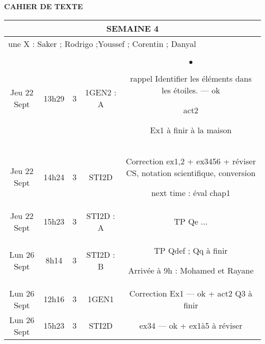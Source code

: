 \documentclass[10pt]{article}
\newcommand{\mypage}[1]{ 
		\begin{minipage}[c]{0.45\textwidth}
			\vspace{5pt}
			{#1}
			\vspace{5pt}
		\end{minipage}
}
\newcommand{\seancea}{	\mypage{
	\begin{list}{$\bullet$}{}
		\item rappel Identifier les éléments dans les étoiles. — ok
		\item act2
		\item Ex1 à finir à la maison
	\end{list}
}}
\newcommand{\seanceb}{	\mypage{ Correction ex1,2 + ex3456 + réviser CS, notation
scientifique, conversion

next time : éval chap1}}
\newcommand{\seancec}{	\mypage{TP Qe ...}}
\newcommand{\seanced}{	\mypage{
	TP Qdef ; Qq à finir
	
	Arrivée à 9h : Mohamed et Rayane
	}}
\newcommand{\seancef}{	\mypage{
	Correction Ex1 --- ok
	+ act2 Q3 à finir 
	}}
\newcommand{\seanceg}{	\mypage{ex34 --- ok 
	+ ex1à5 à réviser
	}}
\begin{document}
\begin{center}
	\textbf{CAHIER DE TEXTE}
\end{center}

\setlength{\tabcolsep}{13pt}
\renewcommand{\arraystretch}{2.5}
\begin{longtable}{@{}|c|c|c|c|c|@{}} \toprule
	\midrule\multicolumn{5}{||c||}{SEMAINE 4}                                  \\\midrule
	\multicolumn{5}{|l|}{une X : Saker ; Rodrigo ;Youssef ; Corentin ; Danyal} \\\midrule
	Jeu 22 Sept & 13h29 & 3 & 1GEN2 : A & \seancea                             \\\midrule
	Jeu 22 Sept & 14h24 & 3 & STI2D     & \seanceb                             \\\midrule
	Jeu 22 Sept & 15h23 & 3 & STI2D : A & \seancec                             \\\midrule\midrule
	Lun 26 Sept & 8h14  & 3 & STI2D : B & \seanced                             \\\midrule
	Lun 26 Sept & 12h16 & 3 & 1GEN1     & \seancef                             \\\midrule
	Lun 26 Sept & 15h23 & 3 & STI2D     & \seanceg                             \\\midrule


	\bottomrule
\end{longtable}
\end{document}
